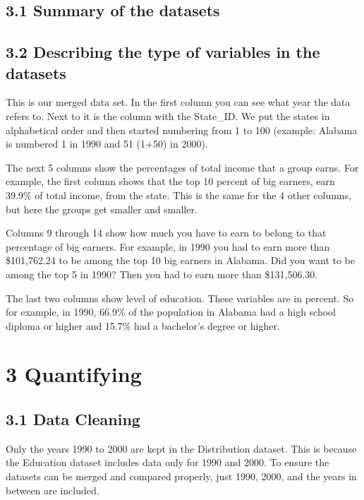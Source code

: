 \documentclass[
]{article}
\begin{document}
\subsection{3.1 Summary of the datasets}\label{summary-of-the-datasets}

\subsection{3.2 Describing the type of variables in the
datasets}\label{describing-the-type-of-variables-in-the-datasets}

This is our merged data set. In the first column you can see what year
the data refers to. Next to it is the column with the State\_ID. We put
the states in alphabetical order and then started numbering from 1 to
100 (example: Alabama is numbered 1 in 1990 and 51 (1+50) in 2000).

The next 5 columns show the percentages of total income that a group
earns. For example, the first column shows that the top 10 percent of
big earners, earn 39.9\% of total income, from the state. This is the
same for the 4 other columns, but here the groups get smaller and
smaller.

Columns 9 through 14 show how much you have to earn to belong to that
percentage of big earners. For example, in 1990 you had to earn more
than \$101,762.24 to be among the top 10 big earners in Alabama. Did you
want to be among the top 5 in 1990? Then you had to earn more than
\$131,506.30.

The last two columns show level of education. These variables are in
percent. So for example, in 1990, 66.9\% of the population in Alabama
had a high school diploma or higher and 15.7\% had a bachelor's degree
or higher.

\section{3 Quantifying}\label{quantifying}

\subsection{3.1 Data Cleaning}\label{data-cleaning}

Only the years 1990 to 2000 are kept in the Distribution dataset. This
is because the Education dataset includes data only for 1990 and 2000.
To ensure the datasets can be merged and compared properly, just 1990,
2000, and the years in between are included.
\end{document}
